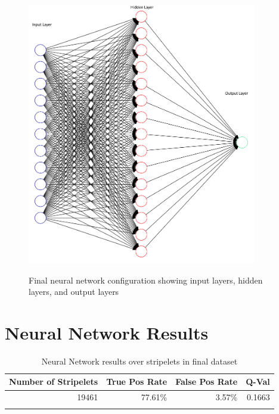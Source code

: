 \documentclass[12pt]{ucthesis}
\newcommand{\captionfonts}{\small\bf\ssp}
\begin{document}
\begin{figure}[t]
\begin{center}
\includegraphics[width=10cm]{ChosenNN2.png}
\captionfonts
\caption[Final Neural Network Configuration]{Final neural network configuration showing input layers, hidden layers, and output layers}
\label{fig:Neural1png}
\end{center}
\end{figure}

\clearpage

\section{Neural Network Results}

    \begin{table}[t]
        \begin{longtable}{|r|r|r|r|}
        \hline
        Number of Stripelets & True Pos Rate & False Pos Rate & Q-Val \bigstrut\\
        \hline
        19461 & 77.61\% & 3.57\% & 0.1663 \bigstrut\\
        \hline
    
        \caption{Neural Network results over stripelets in final dataset}
        \label{tab:nnresultsoverall} 
        \end{longtable}
    \end{table}
\end{document}
